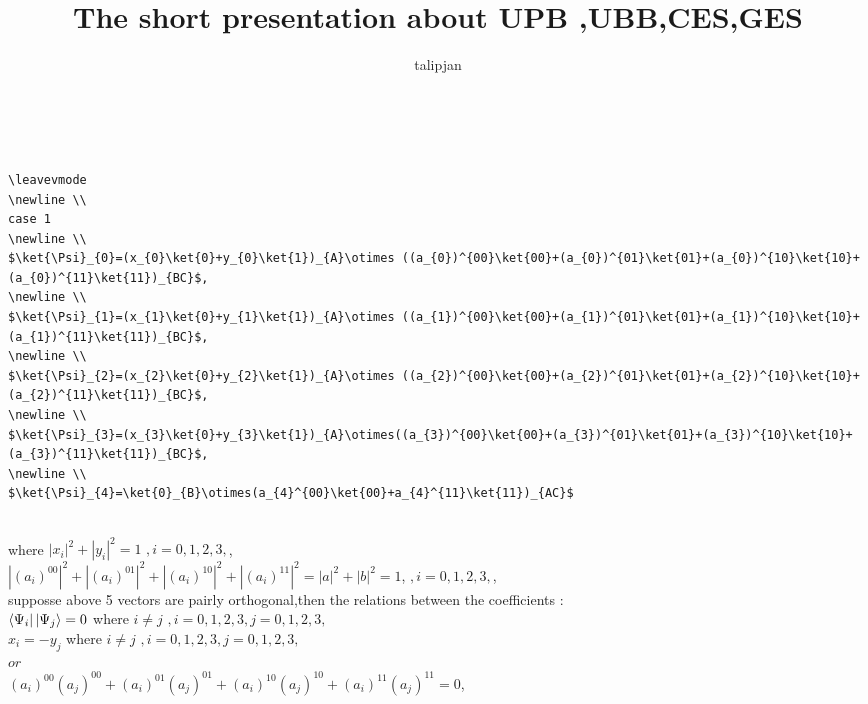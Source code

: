 \documentclass[a4paper,12pt]{article}
\title{The short presentation about UPB ,UBB,CES,GES}
\author{talipjan}
\begin{document}
	\begin{verbatim}
	
	
\leavevmode
\newline \\
case 1
\newline \\
$\ket{\Psi}_{0}=(x_{0}\ket{0}+y_{0}\ket{1})_{A}\otimes ((a_{0})^{00}\ket{00}+(a_{0})^{01}\ket{01}+(a_{0})^{10}\ket{10}+(a_{0})^{11}\ket{11})_{BC}$,
\newline \\
$\ket{\Psi}_{1}=(x_{1}\ket{0}+y_{1}\ket{1})_{A}\otimes ((a_{1})^{00}\ket{00}+(a_{1})^{01}\ket{01}+(a_{1})^{10}\ket{10}+(a_{1})^{11}\ket{11})_{BC}$,
\newline \\
$\ket{\Psi}_{2}=(x_{2}\ket{0}+y_{2}\ket{1})_{A}\otimes ((a_{2})^{00}\ket{00}+(a_{2})^{01}\ket{01}+(a_{2})^{10}\ket{10}+(a_{2})^{11}\ket{11})_{BC}$,
\newline \\
$\ket{\Psi}_{3}=(x_{3}\ket{0}+y_{3}\ket{1})_{A}\otimes((a_{3})^{00}\ket{00}+(a_{3})^{01}\ket{01}+(a_{3})^{10}\ket{10}+(a_{3})^{11}\ket{11})_{BC}$,
\newline \\
$\ket{\Psi}_{4}=\ket{0}_{B}\otimes(a_{4}^{00}\ket{00}+a_{4}^{11}\ket{11})_{AC}$
\end{verbatim}
\newline \\
where $|x_{i}|^{2}+|y_{i}|^{2}=1     $ $       ,i=0,1,2,3,$,
\newline \\
$|(a_{i})^{00}|^{2}+|(a_{i})^{01}|^{2}+|(a_{i})^{10}|^{2}+|(a_{i})^{11}|^{2}=|a|^{2}+|b|^{2}=1     $,    $       ,i=0,1,2,3,$,
\newline \\
supposse above 5 vectors are pairly orthogonal,then the relations between the coefficients :
\newline \\
$\bra{\Psi_{i}}\ket{\Psi_{j}}=0        $  where  $i\neq j$   $     ,i=0,1,2,3,   j=0,1,2,3, $ 
\newline \\
$x_{i}=-y_{j}$  where  $i\neq j$   $     ,i=0,1,2,3,   j=0,1,2,3, $ 
\newline \\
$or  $ 
\newline \\
$(a_{i})^{00}(a_{j})^{00}+(a_{i})^{01}(a_{j})^{01}+(a_{i})^{10}(a_{j})^{10}+(a_{i})^{11}(a_{j})^{11}=0$,
\end{document}
